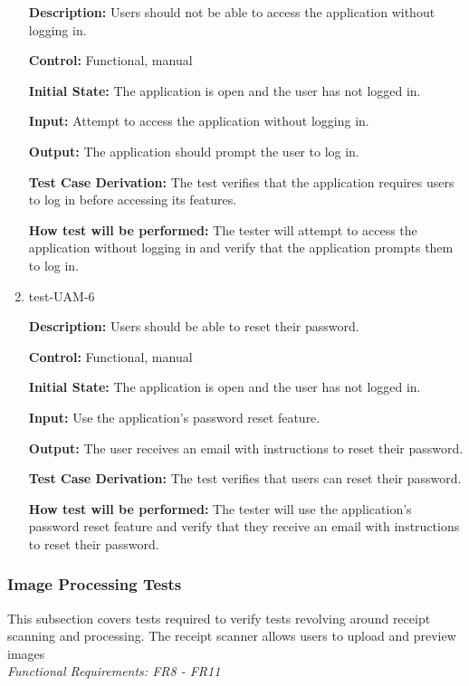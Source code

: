 \documentclass[12pt, titlepage]{article}
\begin{document}
\begin{enumerate}
\textbf{Description:} Users should not be able to access the application without
logging in.

\textbf{Control:} Functional, manual

\textbf{Initial State:} The application is open and the user has not logged in.

\textbf{Input:} Attempt to access the application without logging in.

\textbf{Output:} The application should prompt the user to log in.

\textbf{Test Case Derivation:} The test verifies that the application requires
users to log in before accessing its features.

\textbf{How test will be performed:} The tester will attempt to access the
application without logging in and verify that the application prompts them to log
in.

\item{test-UAM-6}

\textbf{Description:} Users should be able to reset their password.

\textbf{Control:} Functional, manual

\textbf{Initial State:} The application is open and the user has not logged in.

\textbf{Input:} Use the application's password reset feature.

\textbf{Output:} The user receives an email with instructions to reset their password.

\textbf{Test Case Derivation:} The test verifies that users can reset their
password.

\textbf{How test will be performed:} The tester will use the application's
password reset feature and verify that they receive an email with instructions
to reset their password.

\end{enumerate}

\subsubsection{Image Processing Tests}

This subsection covers tests required to verify tests revolving around receipt scanning and processing. The receipt scanner allows users to upload and preview images\\
\textit{Functional Requirements: FR8 - FR11}
\end{document}
